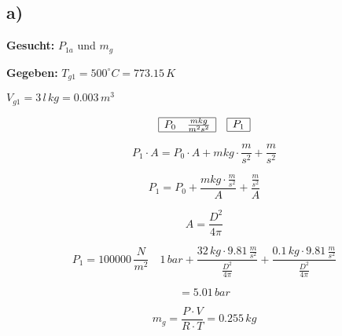 

\subsection*{a)}
\textbf{Gesucht:} $P_{1a}$ und $m_g$

\textbf{Gegeben:} $T_{g1} = 500^\circ C = 773.15\,K$

$V_{g1} = 3\,l\,kg = 0.003\,m^3$

\[
\begin{array}{c}
\begin{array}{|c|}
\hline
P_0 \quad \frac{mkg}{m^2s^2} \\
\hline
\end{array}
\quad
\begin{array}{|c|}
\hline
P_1 \\
\hline
\end{array}
\end{array}
\]

\[
P_1 \cdot A = P_0 \cdot A + mkg \cdot \frac{m}{s^2} + \frac{m}{s^2}
\]

\[
P_1 = P_0 + \frac{mkg \cdot \frac{m}{s^2}}{A} + \frac{\frac{m}{s^2}}{A}
\]

\[
A = \frac{D^2}{4\pi}
\]

\[
P_1 = 100000\,\frac{N}{m^2} \quad 1\,bar + \frac{32\,kg \cdot 9.81\,\frac{m}{s^2}}{\frac{D^2}{4\pi}} + \frac{0.1\,kg \cdot 9.81\,\frac{m}{s^2}}{\frac{D^2}{4\pi}}
\]

\[
= 5.01\,bar
\]

\[
m_g = \frac{P \cdot V}{R \cdot T} = 0.255\,kg
\]